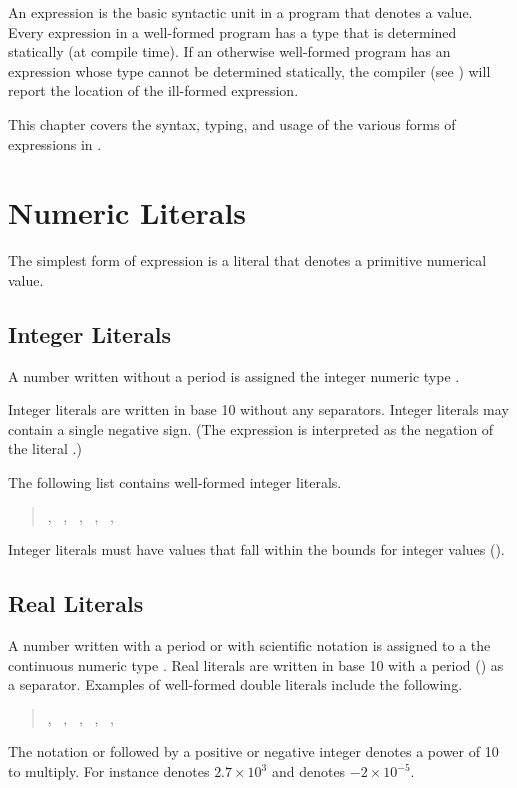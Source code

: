 An expression is the basic syntactic unit in a \Stan program that
denotes a value.  Every expression in a well-formed \Stan program has
a type that is determined statically (at compile time).  If an
otherwise well-formed program has an expression whose type cannot be
determined statically, the \Stan compiler (see )
will report the location of the ill-formed expression.

This chapter covers the syntax, typing, and usage of the various forms
of expressions in \Stan. 

\section{Numeric Literals}

The simplest form of expression is a literal that denotes a primitive
numerical value.   

\subsection{Integer Literals}

A number written without a period is assigned the integer numeric type
.

Integer literals are written in base 10 without any separators.
Integer literals may contain a single negative sign.  (The expression
 is interpreted as the negation of the literal .)

The following list contains well-formed integer literals.
%
\begin{quote}
, \ , \ , \ , 
\ , \ 
\end{quote}
%
Integer literals must have values that fall within the bounds for
integer values ().

\subsection{Real Literals}

A number written with a period or with scientific notation is assigned
to a the continuous numeric type .  Real literals are
written in base 10 with a period () as a separator.  Examples
of well-formed double literals include the following.
%
\begin{quote}
, \ , \ , \ , \ 
, \ 
\end{quote}
%
The notation  or  followed by a positive or negative
integer denotes a power of 10 to multiply.  For instance \code{2.7e3}
denotes $2.7 \times 10^3$ and \code{-2E-5} denotes $-2 \times
10^{-5}$.


